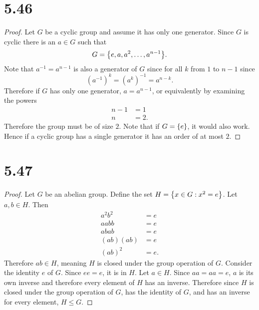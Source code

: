 \documentclass[12pt]{extarticle}
\begin{document}
\section*{5.46}
\begin{proof}
	Let $G$ be a cyclic group and assume it has only one generator. Since $G$ is cyclic there is an $a \in G$ such that 
	\[
		G = \qty{e, a, a^2, \ldots, a^{n-1}}
	.\]
	Note that $a^{-1} = a^{n-1}$ is also a generator of $G$ since for all $k$ from $1$ to $n-1$ since
	\[
		(a^{-1})^k = (a^k)^{-1} = a^{n-k}
	.\]
	Therefore if $G$ has only one generator, $a = a^{n-1}$, or equivalently by examining the powers
	\begin{align*}
		n-1 &= 1 \\
		n &= 2
	.\end{align*}
	Therefore the group must be of size $2$. Note that if $G = \qty{e}$, it would also work. Hence if a cyclic group has a single generator it has an order of at most $2$.
\end{proof}

\section*{5.47}
\begin{proof}
	Let $G$ be an abelian group. Define the set $H = \qty{x \in G : x^2 = e}$. Let $a,b \in H$. Then
	\begin{align*}
		a^2 b^2 &= e \\
		aa bb &= e \\
		abab &= e \tag{Since $G$ is abelian} \\
		(ab)(ab) &= e \tag{By associativity}\\
		(ab)^2 &= e
	.\end{align*}
	Therefore $ab \in H$, meaning $H$ is closed under the group operation of $G$. Consider the identity $e$ of $G$. Since $ee = e$, it is in $H$. Let $a \in H$. Since $aa = aa = e$, $a$ is its own inverse and therefore every element of $H$ has an inverse. Therefore since $H$ is closed under the group operation of $G$, has the identity of $G$, and has an inverse for every element, $H \leq G$.
\end{proof}
\end{document}
